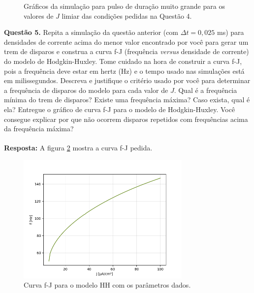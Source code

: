 \documentclass[english,11pt,a4paper]{article}
\begin{document}
\begin{figure}[H]
\begin{minipage}{0.49\textwidth}
			\captionsetup{justification=centering, labelformat=empty}
			\label{}
		\end{minipage}
		\caption{Gráficos da simulação para pulso de duração muito grande para os valores de $J$ limiar das condições pedidas na Questão 4.}
		\label{fig4}
	\end{figure}
	
	\noindent \textbf{Questão 5.} Repita a simulação da questão anterior (com $\Delta t = 0{,}025$ ms) para densidades de corrente acima do menor valor encontrado por você para gerar um trem de disparos e construa a curva f-J (frequência \textit{versus} densidade de corrente) do modelo de Hodgkin-Huxley. Tome cuidado na hora de construir a curva f-J, pois a frequência deve estar em hertz (Hz) e o tempo usado nas simulações está em milissegundos. Descreva e justifique o critério usado por você para determinar a frequência de disparos do modelo para cada valor de $J$. Qual é a frequência mínima do trem de disparos? Existe uma frequência máxima? Caso exista, qual é ela? Entregue o gráfico de curva f-J para o modelo de Hodgkin-Huxley. Você consegue explicar por que não ocorrem disparos repetidos com frequências acima da frequência máxima?\\\\
	
	\textbf{Resposta:} A figura \ref{fig5} mostra a curva f-J pedida.
	
	\begin{figure}[H]
		\centering
		\includegraphics[width=8.5cm]{../figures/ex_5.png}
		\caption{Curva f-J para o modelo HH com os parâmetros dados.}
		\label{fig5}
	\end{figure}
	
\end{document}
